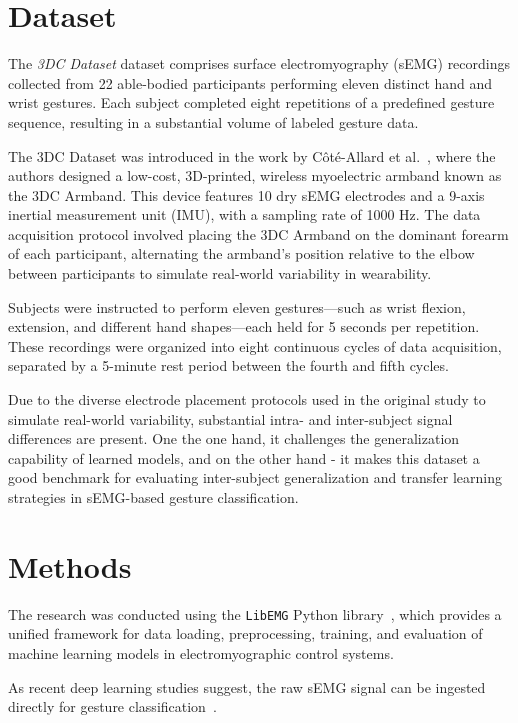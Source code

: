 \section{Dataset}

The \textit{3DC Dataset} dataset comprises surface electromyography (sEMG) recordings collected from 22 able-bodied participants performing eleven distinct hand and wrist gestures. Each subject completed eight repetitions of a predefined gesture sequence, resulting in a substantial volume of labeled gesture data.

The 3DC Dataset was introduced in the work by Côté-Allard et al.~\cite{Cote2019_3DC}, where the authors designed a low-cost, 3D-printed, wireless myoelectric armband known as the 3DC Armband. This device features 10 dry sEMG electrodes and a 9-axis inertial measurement unit (IMU), with a sampling rate of 1000 Hz. The data acquisition protocol involved placing the 3DC Armband on the dominant forearm of each participant, alternating the armband's position relative to the elbow between participants to simulate real-world variability in wearability.

Subjects were instructed to perform eleven gestures—such as wrist flexion, extension, and different hand shapes—each held for 5 seconds per repetition. These recordings were organized into eight continuous cycles of data acquisition, separated by a 5-minute rest period between the fourth and fifth cycles.

Due to the diverse electrode placement protocols used in the original study to simulate real-world variability, substantial intra- and inter-subject signal differences are present. One the one hand, it challenges the generalization capability of learned models, and on the other hand - it makes this dataset a good benchmark for evaluating inter-subject generalization and transfer learning strategies in sEMG-based gesture classification.

\section{Methods}

The research was conducted using the \texttt{LibEMG} Python library~\cite{LibEMG2023}, which provides a unified framework for data loading, preprocessing, training, and evaluation of machine learning models in electromyographic control systems.

As recent deep learning studies suggest, the raw sEMG signal can be ingested directly for gesture classification~\cite{Oskoei2007,Rehman2018,Cote2019}.

